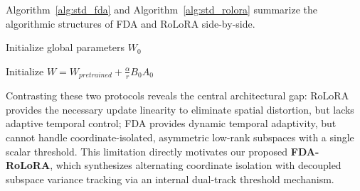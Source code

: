 Algorithm~\ref{alg:std_fda} and Algorithm~\ref{alg:std_rolora} summarize the algorithmic structures of FDA and RoLoRA side-by-side.

\vspace{0.2cm}
\noindent
\begin{minipage}[t]{0.485\textwidth}
\begin{algorithm}[H]
\SetAlFnt{\footnotesize}
\SetAlCapFnt{\small}
\SetAlCapNameFnt{\small}
\caption{FDA}
\label{alg:std_fda}
Initialize global parameters $W_0$\;
\end{algorithm}
\end{minipage}\hfill
\begin{minipage}[t]{0.485\textwidth}
\begin{algorithm}[H]
\SetAlFnt{\footnotesize}
\SetAlCapFnt{\small}
\SetAlCapNameFnt{\small}
\caption{RoLoRA}
\label{alg:std_rolora}
Initialize $W = W_{pretrained} + \frac{\alpha}{r} B_0 A_0$\;
\end{algorithm}
\end{minipage}
\vspace{0.3cm}

Contrasting these two protocols reveals the central architectural gap: RoLoRA provides the necessary update linearity to eliminate spatial distortion, but lacks adaptive temporal control; FDA provides dynamic temporal adaptivity, but cannot handle coordinate-isolated, asymmetric low-rank subspaces with a single scalar threshold. This limitation directly motivates our proposed \textbf{FDA-RoLoRA}, which synthesizes alternating coordinate isolation with decoupled subspace variance tracking via an internal dual-track threshold mechanism.

